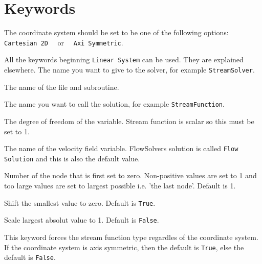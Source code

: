 \section{Keywords}

\sifbegin
  \sifbegin
    The coordinate system should be set to be one of the following options:
    {\tt Cartesian 2D}~~ or~~ {\tt Axi Symmetric}. 
  \sifend

   \newline
  All the keywords beginning {\tt Linear System} can be used. 
  They are explained elsewhere. 
  \sifbegin
    The name you want to give to the solver, for example {\tt StreamSolver}.

    The name of the file and subroutine.

    The name you want to call the solution, for example {\tt StreamFunction}.

    The degree of freedom of the variable. Stream function is scalar so this must be set to 1.
 
    The name of the velocity field variable. FlowSolvers solution is
    called {\tt Flow Solution} and this is also the default value.

    Number of the node that is first set to zero. Non-positive values are set to 1 and
    too large values are set to largest possible i.e. 'the last node'. Default is 1.

    Shift the smallest value to zero. Default is {\tt True}.

    Scale largest absolut value to 1. Default is {\tt False}.

    This keyword forces the stream function type regardles of the coordinate system.
    If the coordinate system is axis symmetric, then the default is {\tt True},
    else the default is {\tt False}.
  \sifend
\sifend

%
%


